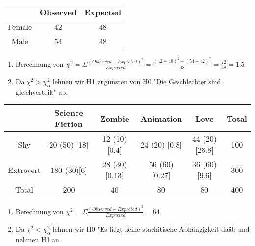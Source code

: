 \begin{tabular}{|c|c|c|}
\hline
 & Observed & Expected \\ \hline
Female & 42 & 48 \\ \hline
Male & 54 & 48 \\ \hline

\end{tabular}


\begin{enumerate}
	\item Berechnung von $ \chi ^ 2= \Sigma \frac{(Observed - Expected)^2}{Expected}=\frac{(42-48)^2 + (54-42)^2}{48}=\frac{72}{48}=1.5$ 

	\item  Da $ \chi ^2 > \chi _{\alpha} ^ 2$ lehnen wir H1 zugunsten von H0 "Die Geschlechter sind gleichverteilt" ab. %
\end{enumerate}

\begin{tabular}{|c|c|c|c|c|c|}
\hline
 & Science Fiction & Zombie & Animation & Love & Total \\ \hline
Shy 		& 20 (50) [18]	& 12 (10) [0.4] & 24 (20) [0.8] & 44 (20) [28.8]& 100\\ \hline
Extrovert 	& 180 (30)[6] 	& 28 (30) [0.13] & 56 (60)[0.27]& 36 (60) [9.6] &300 \\ \hline
Total 		& 200 		& 40 	& 80& 80& 400 \\ \hline
\end{tabular}

\begin{enumerate}

	\item Berechnung von $ \chi ^ 2= \Sigma \frac{(Observed - Expected)^2}{Expected}=64$ 
	\item Da $ \chi ^2 < \chi _{\alpha} ^ 2$ lehnen wir H0 "Es liegt keine stachitische Abhängigkeit da\" ab und nehmen H1 an.

\end{enumerate}



